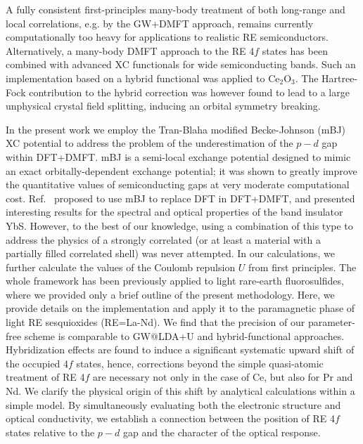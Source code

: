 \documentclass[aps,prb,twocolumn,amsmath,amssymb]{revtex4}
\newcommand{\jb}[1]{\textcolor{red}{#1}}
\begin{document}
A fully consistent first-principles many-body treatment of both long-range and local correlations, e.g. by the GW+DMFT approach\cite{Biermann2003}, remains currently computationally too heavy for applications to realistic RE semiconductors. Alternatively, a many-body DMFT approach to the RE 4$f$ states has been combined  with advanced XC functionals for wide semiconducting bands. Such an implementation based on a hybrid functional was applied to Ce$_2$O$_3$\cite{Jacob2008}. The Hartree-Fock contribution to the hybrid correction was however found to lead to a large unphysical crystal field splitting\cite{Jacob2008}, inducing an orbital symmetry breaking.

In the present work we 
employ the Tran-Blaha modified Becke-Johnson (mBJ) XC potential\cite{Becke2006,Tran2009} to address the problem of the underestimation of the $p-d$ gap within DFT+DMFT. mBJ  is a semi-local exchange potential designed to mimic an exact orbitally-dependent exchange potential;  it was shown to greatly improve the quantitative values of semiconducting gaps\cite{Tran2009,Koller2011} at very moderate computational cost. Ref.~ proposed to use mBJ to
replace DFT in DFT+DMFT, and presented interesting results for the
spectral and optical properties of the band insulator YbS. However,
to the best of our knowledge, using a combination of this type 
to address the physics of a strongly correlated (or at least a 
material with a partially filled correlated shell) was never 
attempted.
In our calculations, we further calculate the values of the Coulomb repulsion $U$  from first principles. The whole framework has been previously applied to light rare-earth fluorosulfides\cite{LnSF_paper}, where we provided only a brief outline of the present methodology. Here, we provide details on the implementation and apply it to  the paramagnetic phase of light RE sesquioxides (RE=La-Nd). We find that the precision of our parameter-free scheme is comparable to GW@LDA+U and hybrid-functional approaches. Hybridization effects are found to  induce a 
significant 
systematic upward shift of the occupied 4$f$ states, hence, corrections beyond the simple quasi-atomic treatment\cite{Hubbard1963} of RE 4$f$ are necessary not only in the case of Ce, but also for Pr and Nd. 
We clarify the physical origin of this shift by analytical calculations within a simple model. 
By  simultaneously evaluating both the electronic structure and optical conductivity, we establish a connection between the position of RE 4$f$ states relative to the $p-d$ gap and the character of the optical response.
\end{document}
